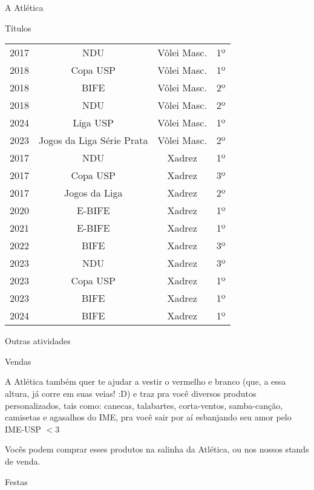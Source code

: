 \begin{secao}{A Atlética}
\begin{subsecao}{Títulos}
\begin{center}
\begin{tabular}{|c|c|c|c|}
    2017 & NDU            & Vôlei Masc.     & 1º\\
    2018 & Copa USP       & Vôlei Masc.     & 1º\\
    2018 & BIFE           & Vôlei Masc.     & 2º\\
    2018 & NDU            & Vôlei Masc.     & 2º\\
    2024 & Liga USP       & Vôlei Masc.     & 1º\\
    2023 & Jogos da Liga Série Prata & Vôlei Masc. & 2º\\
    2017 & NDU            & Xadrez          & 1º\\
    2017 & Copa USP       & Xadrez          & 3º\\
    2017 & Jogos da Liga  & Xadrez          & 2º\\
    2020 & E-BIFE         & Xadrez          & 1º\\
    2021 & E-BIFE         & Xadrez          & 1º\\
    2022 & BIFE           & Xadrez          & 3º\\
    2023 & NDU            & Xadrez          & 3º\\
    2023 & Copa USP       & Xadrez          & 1º\\
    2023 & BIFE           & Xadrez          & 1º\\
    2024 & BIFE           & Xadrez          & 1º\\
    \hline
  \end{tabular}
\end{center}

\end{subsecao}
\begin{subsecao}{Outras atividades}

\begin{subsubsecao}{Vendas}

A Atlética também quer te ajudar a vestir o vermelho e branco (que, a essa
altura, já corre em suas veias! :D) e traz pra você diversos produtos
personalizados, tais como: canecas, talabartes, corta-ventos,
samba-canção, camisetas e agasalhos do
IME, pra você sair por aí esbanjando seu amor pelo IME-USP $<$3

Vocês podem comprar esses produtos na salinha da Atlética, ou nos nossos
stands de venda.

\end{subsubsecao}
\begin{subsubsecao}{Festas}


\end{subsubsecao}
\end{subsecao}
\end{secao}
